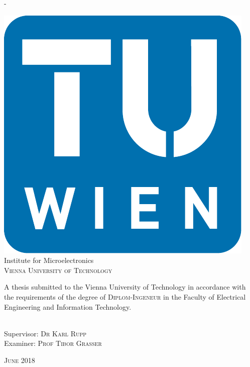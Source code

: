 \begin{titlingpage}
\begin{SingleSpace}
\begin{adjustwidth*}{\unitlength}{-\unitlength}
\begin{center}
\includegraphics[scale=0.5]{logos/TU_Signet}\\
\vspace{6mm}
{\large Institute for Microelectronics\\
\textsc{Vienna University of Technology}}\\
\vspace{11mm}
\begin{minipage}{12cm}
A thesis submitted to the Vienna University of Technology in accordance with the requirements of the degree of \textsc{Diplom-Ingeneur} in the Faculty of Electrical Engineering and Information Technology.
\end{minipage}\\
\vspace*{7mm}
{Supervisor: \textsc{Dr Karl Rupp}\\
Examiner: \textsc{Prof Tibor Grasser}}

\vspace{5mm}
{\large\textsc{June 2018}}
\vspace{12mm}
\end{center}
\begin{flushright}
\end{flushright}
\end{adjustwidth*}
\end{SingleSpace}
\end{titlingpage}